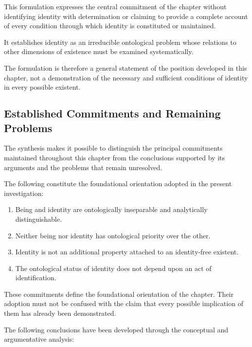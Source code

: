This formulation expresses the central commitment
of the chapter without identifying identity with
determination or claiming to provide a complete
account of every condition through which identity
is constituted or maintained.

It establishes identity as an irreducible
ontological problem whose relations to other
dimensions of existence must be examined
systematically.

The formulation is therefore a general statement
of the position developed in this chapter, not
a demonstration of the necessary and sufficient
conditions of identity in every possible existent.

\subsection{Established Commitments and Remaining Problems}

The synthesis makes it possible to distinguish
the principal commitments maintained throughout
this chapter from the conclusions supported by
its arguments and the problems that remain
unresolved.

The following constitute the foundational
orientation adopted in the present investigation:

\begin{enumerate}
    \item Being and identity are ontologically
    inseparable and analytically distinguishable.

    \item Neither being nor identity has
    ontological priority over the other.

    \item Identity is not an additional property
    attached to an identity-free existent.

    \item The ontological status of identity
    does not depend upon an act of identification.
\end{enumerate}

These commitments define the foundational
orientation of the chapter. Their adoption
must not be confused with the claim that every
possible implication of them has already been
demonstrated.

The following conclusions have been developed
through the conceptual and argumentative analysis:

